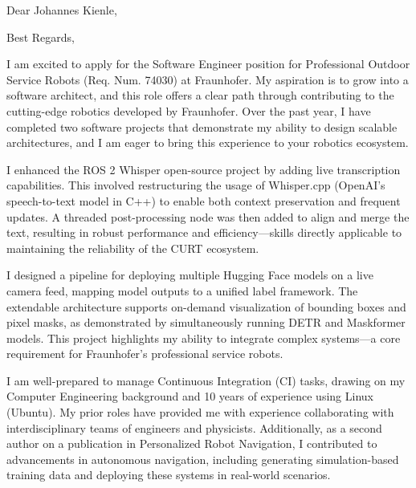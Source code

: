 \documentclass[11pt,a4paper,skipsamekey]{moderncv}
\begin{document}
	
\date{\today}
\opening{Dear Johannes Kienle,}
\closing{Best Regards,}
\makelettertitle

\par
I am excited to apply for the Software Engineer position for Professional Outdoor Service Robots (Req. Num. 74030) at Fraunhofer.
My aspiration is to grow into a software architect, and this role offers a clear path through contributing to the cutting-edge robotics developed by Fraunhofer.
Over the past year, I have completed two software projects that demonstrate my ability to design scalable architectures, and I am eager to bring this experience to your robotics ecosystem.

\par
I enhanced the ROS 2 Whisper open-source project by adding live transcription capabilities.
This involved restructuring the usage of Whisper.cpp (OpenAI's speech-to-text model in C++) to enable both context preservation and frequent updates.
A threaded post-processing node was then added to align and merge the text, resulting in robust performance and efficiency—skills directly applicable to maintaining the reliability of the CURT ecosystem.

\par
I designed a pipeline for deploying multiple Hugging Face models on a live camera feed, mapping model outputs to a unified label framework.
The extendable architecture supports on-demand visualization of bounding boxes and pixel masks, as demonstrated by simultaneously running DETR and Maskformer models.
This project highlights my ability to integrate complex systems—a core requirement for Fraunhofer's professional service robots.

\par
I am well-prepared to manage Continuous Integration (CI) tasks, drawing on my Computer Engineering background and 10 years of experience using Linux (Ubuntu).
My prior roles have provided me with experience collaborating with interdisciplinary teams of engineers and physicists.
Additionally, as a second author on a publication in Personalized Robot Navigation, I contributed to advancements in autonomous navigation, including generating simulation-based training data and deploying these systems in real-world scenarios.
\end{document}

